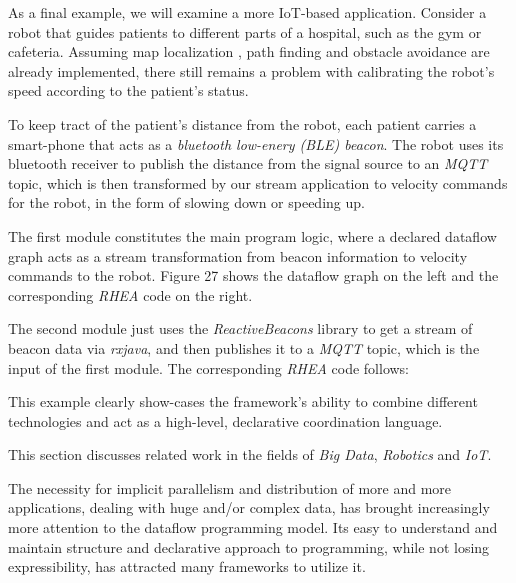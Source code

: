 \documentclass{dithesis}
\begin{document}

As a final example, we will examine a more IoT-based application. Consider a robot that guides patients to different parts of a hospital, such as the gym or cafeteria. Assuming map localization , path finding and obstacle avoidance are already implemented, there still remains a problem with calibrating the robot's speed according to the patient's status. 

To keep tract of the patient's distance from the robot, each patient carries a smart-phone that acts as a \textit{bluetooth low-enery (BLE) beacon}. The robot uses its bluetooth receiver to publish the distance from the signal source to an \textit{MQTT} topic, which is then transformed by our stream application to velocity commands for the robot, in the form of slowing down or speeding up.

The first module constitutes the main program logic, where a declared dataflow graph acts as a stream transformation from beacon information to velocity commands to the robot. Figure 27 shows the dataflow graph on the left and the corresponding \textit{RHEA} code on the right.


The second module just uses the \textit{ReactiveBeacons} library to get a stream of beacon data via \textit{rxjava}, and then publishes it to a \textit{MQTT} topic, which is the input of the first module. The corresponding \textit{RHEA} code follows:
\\

This example clearly show-cases the framework's ability to combine different technologies and act as a high-level, declarative coordination language.




This section discusses related work in the fields of \textit{Big Data}, \textit{Robotics} and \textit{IoT}.


The necessity for implicit parallelism and distribution of more and more applications, dealing with huge and/or complex data, has brought increasingly more attention to the dataflow programming model. Its easy to understand and maintain structure and declarative approach to programming, while not losing expressibility, has attracted many frameworks to utilize it.
\end{document}
